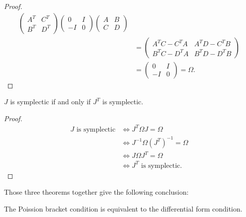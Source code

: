 \begin{proof}
\begin{align*}
\begin{pmatrix}
            A^T & C^T \\ B^T & D^T
        \end{pmatrix}
        \begin{pmatrix}
            0 & I \\ -I & 0
        \end{pmatrix}
        \begin{pmatrix}
            A & B \\ C & D
        \end{pmatrix}  \\ 
        &= 
        \begin{pmatrix}
            A^{T}C - C^{T}A & A^{T}D - C^{T}B \\
            B^{T}C - D^{T}A & B^{T}D - D^{T}B
        \end{pmatrix} \\
        &= 
        \begin{pmatrix}
            0 & I \\ -I & 0
        \end{pmatrix} = \Omega.
    \end{align*}
\end{proof}
\begin{theorem}
    $J$ is symplectic if and only if $J^T$ is symplectic.
\end{theorem}
\begin{proof}
    \begin{align*}
        J \text{ is symplectic} &\Leftrightarrow J^T\Omega J = \Omega \\ 
        &\Leftrightarrow J^{-1}\Omega (J^T)^{-1} = \Omega \\ 
        &\Leftrightarrow J\Omega J^T = \Omega \\
        &\Leftrightarrow J^T \text{ is symplectic}.
    \end{align*} 
\end{proof}
Those three theorems together give the following conclusion:
\begin{theorem}
    The Poission bracket condition is equivalent to the differential form 
    condition.
\end{theorem}
